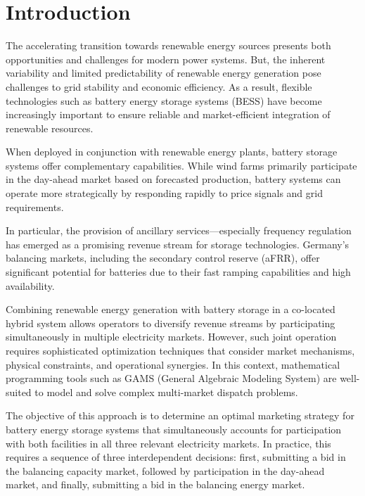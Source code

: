 \chapter{Introduction}

The accelerating transition towards renewable energy sources presents both opportunities and challenges for modern
power systems. But, the inherent variability and limited predictability of renewable energy generation pose
challenges to grid stability and economic efficiency. As a result, flexible technologies such as battery energy
storage systems (BESS) have become increasingly important to ensure reliable and market-efficient integration of
renewable resources.

When deployed in conjunction with renewable energy plants, battery storage systems offer complementary capabilities.
While wind farms primarily participate in the day-ahead market based on forecasted production,
battery systems can operate more strategically by responding rapidly to price signals and grid requirements.


In particular, the provision of ancillary services—especially frequency regulation has emerged as a promising
revenue stream for storage technologies. Germany's balancing markets, including the secondary
control reserve (aFRR), offer significant potential for batteries due to their fast ramping capabilities and
high availability.

Combining renewable energy generation with battery storage in a co-located hybrid system allows operators to diversify
revenue streams by participating simultaneously in multiple electricity markets.
However, such joint operation
requires sophisticated optimization techniques that consider market mechanisms, physical constraints,
and operational synergies. In this context, mathematical programming tools such as GAMS (General Algebraic Modeling System)
are well-suited to model and solve complex multi-market dispatch problems.

The objective of this approach is to determine an optimal marketing strategy for battery energy storage
systems that simultaneously accounts for participation with both facilities in all three relevant electricity
markets.
In practice, this requires a sequence of three interdependent decisions: first, submitting a bid in
the balancing capacity market, followed by participation in the day-ahead market, and finally,
submitting a bid in the balancing energy market.

